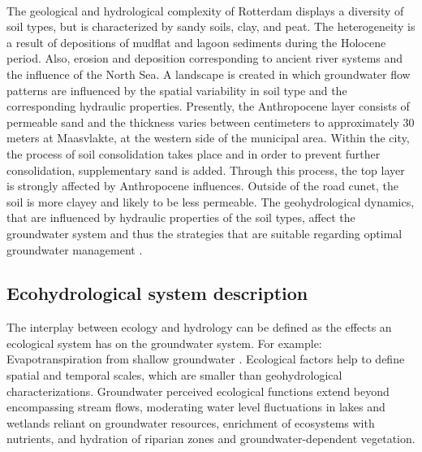 \\
The geological and hydrological complexity of Rotterdam displays a diversity of soil types, but is characterized by sandy soils, clay, and peat. The heterogeneity is a result of depositions of mudflat and lagoon sediments during the Holocene period. Also, erosion and deposition corresponding to ancient river systems and the influence of the North Sea. A landscape is created in which groundwater flow patterns are influenced by the spatial variability in soil type and the corresponding hydraulic properties. Presently, the Anthropocene layer consists of permeable sand and the thickness varies between centimeters to approximately 30 meters at Maasvlakte, at the western side of the municipal area. Within the city, the process of soil consolidation takes place and in order to prevent further consolidation, supplementary sand is added. Through this process, the top layer is strongly affected by Anthropocene influences.  Outside of the road cunet, the soil is more clayey and likely to be less permeable. The geohydrological dynamics, that are influenced by hydraulic properties of the soil types, affect the groundwater system and thus the strategies that are suitable regarding optimal groundwater management \cite{janssen-2005}.

\subsection{Ecohydrological system description}
The interplay between ecology and hydrology can be defined as the effects an ecological system has on the groundwater system. For example: Evapotranspiration from shallow groundwater \cite{ganswijk-1988}. Ecological factors help to define spatial and temporal scales, which are smaller than geohydrological characterizations. Groundwater perceived ecological functions extend beyond encompassing stream flows, moderating water level fluctuations in lakes and wetlands reliant on groundwater resources, enrichment of ecosystems with nutrients, and hydration of riparian zones and groundwater-dependent vegetation.


